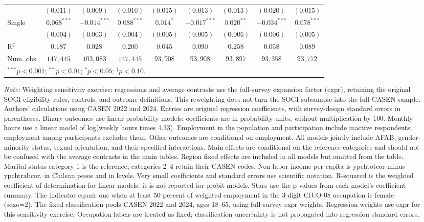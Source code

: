 \begin{table}[htpb]
{\begin{tabular}{l c c c c c c c c}
 & $(0.011)$ & $(0.009)$ & $(0.010)$ & $(0.015)$ & $(0.013)$ & $(0.013)$ & $(0.020)$ & $(0.015)$ \\
Single & $0.068^{***}$ & $-0.014^{***}$ & $0.088^{***}$ & $0.014^{*}$ & $-0.017^{***}$ & $0.020^{**}$ & $-0.034^{***}$ & $0.078^{***}$ \\
 & $(0.004)$ & $(0.003)$ & $(0.004)$ & $(0.005)$ & $(0.005)$ & $(0.006)$ & $(0.006)$ & $(0.005)$ \\
\hline
R$^2$ & $0.187$ & $0.028$ & $0.200$ & $0.045$ & $0.090$ & $0.258$ & $0.058$ & $0.089$ \\
Num. obs. & $147,445$ & $103,083$ & $147,445$ & $93,908$ & $93,908$ & $93,897$ & $93,358$ & $93,772$ \\
\hline
\multicolumn{9}{l}{\scriptsize $^{***}p<0.001$; $^{**}p<0.01$; $^{*}p<0.05$; $^{\dagger}p<0.10$.} \\
\end{tabular}%
}
\par\smallskip
\begin{minipage}{\textwidth}\footnotesize\raggedright
\textit{Note:} Weighting sensitivity exercise: regressions and average contrasts use the full-survey expansion factor (expr), retaining the original SOGI eligibility rules, controls, and outcome definitions. This reweighting does not turn the SOGI subsample into the full CASEN sample. Authors' calculations using CASEN 2022 and 2024. Entries are original regression coefficients, with survey-design standard errors in parentheses. Binary outcomes use linear probability models; coefficients are in probability units, without multiplication by 100. Monthly hours use a linear model of log(weekly hours times 4.33). Employment in the population and participation include inactive respondents; employment among participants excludes them. Other outcomes are conditional on employment. All models jointly include AFAB, gender-minority status, sexual orientation, and their specified interactions. Main effects are conditional on the reference categories and should not be confused with the average contrasts in the main tables. Region fixed effects are included in all models but omitted from the table. Marital-status category 1 is the reference; categories 2--4 retain their CASEN codes. Non-labor income per capita is ypchtotcor minus ypchtrabcor, in Chilean pesos and in levels. Very small coefficients and standard errors use scientific notation. R-squared is the weighted coefficient of determination for linear models; it is not reported for probit models. Stars use the p-values from each model's coefficient summary. The indicator equals one when at least 50 percent of weighted employment in the 3-digit CIUO-08 occupation is female (sexo=2). The fixed classification pools CASEN 2022 and 2024, ages 18--65, using full-survey expr weights. Regression weights use expr for this sensitivity exercise. Occupation labels are treated as fixed; classification uncertainty is not propagated into regression standard errors.
\end{minipage}
\end{table}
